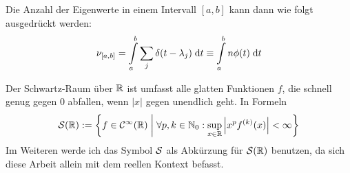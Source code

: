 Die Anzahl der Eigenwerte in einem Intervall $[a, b]$ kann dann wie folgt ausgedrückt werden:
\begin{equation} \label{eq:nu_a_b}
    \nu_{[a, b]} = \int\limits_a^b \sum_j \delta(t - \lambda_j) \;\mathrm{d}t \equiv \int\limits_a^b n \phi(t) \;\mathrm{d}t
\end{equation}

\begin{definition}  \label{def:Schwartz-Raum}
    Der Schwartz-Raum über $\mathbb{R}$ ist umfasst alle glatten Funktionen $f$,
    die schnell genug gegen $0$ abfallen, wenn $|x|$ gegen unendlich geht. \cite{richtmyer}
    In Formeln
    $$\mathcal{S}(\mathbb{R}) := \left\{f \in \mathcal{C}^{\infty}(\mathbb{R}) \;\middle|\; \forall p, k \in \mathbb{N}_0: \sup_{x \in \mathbb{R}} \left| x^pf^{(k)}(x)\right| < \infty \right\}$$
    Im Weiteren werde ich das Symbol $\mathcal{S}$ als Abkürzung für $\mathcal{S}(\mathbb{R})$ benutzen,
    da sich diese Arbeit allein mit dem reellen Kontext befasst.
\end{definition}

